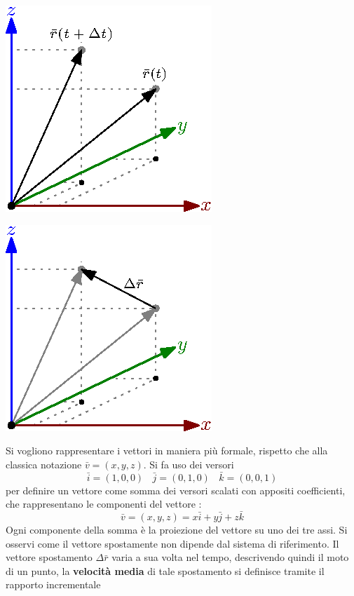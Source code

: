 \documentclass[10pt, letterpaper]{report}
\begin{document}
 \begin{center}
    \centering
    \begin{minipage}{.5\textwidth}
      \centering
      \includegraphics[width=.5\linewidth]{images/spostamento.eps}
    \end{minipage}%
    \begin{minipage}{.5\textwidth}
      \centering
      \includegraphics[width=.5\linewidth]{images/vecSpostamento.eps}
    \end{minipage}
\end{center}
Si vogliono rappresentare i vettori in maniera più formale, rispetto 
che alla classica notazione $\bar v = (x,y,z)$. Si fa uso dei versori 
$$ \bar i = (1,0,0)\ \ \ \
\bar j = (0,1,0)\ \ \ \  
\bar k = (0,0,1) $$
per definire un vettore come somma dei versori scalati con appositi 
 coefficienti, che rappresentano le componenti del vettore : 
 $$ \bar v = (x,y,z) = x\bar i+y\bar j+z \bar k $$
 Ogni componente della somma è la proiezione del vettore su uno dei 
 tre assi. Si osservi come il vettore spostamente non dipende dal sistema di riferimento.\acc 
 Il vettore spostamento $\Delta \bar r$ varia a sua volta nel tempo, 
 descrivendo quindi il moto di un punto, la \textbf{velocità media} di tale 
 spostamento si definisce tramite il rapporto incrementale 
\end{document}
